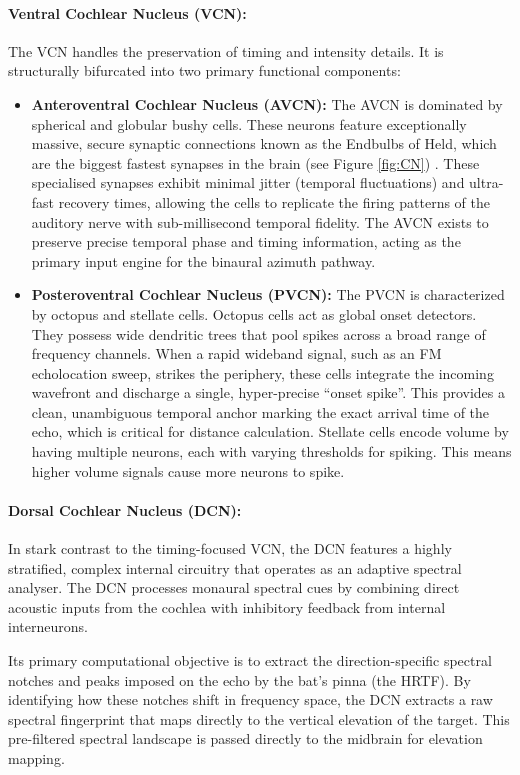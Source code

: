 \paragraph{Ventral Cochlear Nucleus (VCN):} 
The VCN handles the preservation of timing and intensity details. It is structurally bifurcated into two primary functional components:
\begin{itemize}
    \item \textbf{Anteroventral Cochlear Nucleus (AVCN):} The AVCN is dominated by spherical and globular bushy cells. These neurons feature exceptionally massive, secure synaptic connections known as the Endbulbs of Held, which are the biggest fastest synapses in the brain (see Figure \ref{fig:CN}) \cite{Winter2023PartCambridge}. These specialised synapses exhibit minimal jitter (temporal fluctuations) and ultra-fast recovery times, allowing the cells to replicate the firing patterns of the auditory nerve with sub-millisecond temporal fidelity. The AVCN exists to preserve precise temporal phase and timing information, acting as the primary input engine for the binaural azimuth pathway.
    \item \textbf{Posteroventral Cochlear Nucleus (PVCN):} The PVCN is characterized by octopus and stellate cells. Octopus cells act as global onset detectors. They possess wide dendritic trees that pool spikes across a broad range of frequency channels. When a rapid wideband signal, such as an FM echolocation sweep, strikes the periphery, these cells integrate the incoming wavefront and discharge a single, hyper-precise ``onset spike''. This provides a clean, unambiguous temporal anchor marking the exact arrival time of the echo, which is critical for distance calculation. Stellate cells encode volume by having multiple neurons, each with varying thresholds for spiking. This means higher volume signals cause more neurons to spike.
\end{itemize}

\paragraph{Dorsal Cochlear Nucleus (DCN):}
In stark contrast to the timing-focused VCN, the DCN features a highly stratified, complex internal circuitry that operates as an adaptive spectral analyser. The DCN processes monaural spectral cues by combining direct acoustic inputs from the cochlea with inhibitory feedback from internal interneurons. 

Its primary computational objective is to extract the direction-specific spectral notches and peaks imposed on the echo by the bat's pinna (the HRTF). By identifying how these notches shift in frequency space, the DCN extracts a raw spectral fingerprint that maps directly to the vertical elevation of the target. This pre-filtered spectral landscape is passed directly to the midbrain for elevation mapping.


